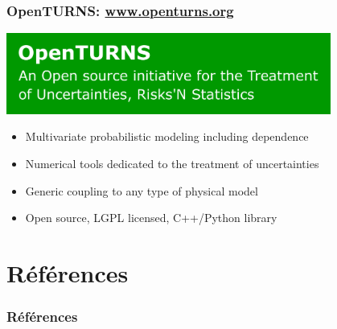 \documentclass[10pt]{beamer}
\begin{document}

\begin{frame}
\frametitle{OpenTURNS: \url{www.openturns.org}}

\begin{center}
\includegraphics[width=0.8\textwidth]{figures/OT.pdf}
\end{center}
	
\begin{itemize}
\item Multivariate probabilistic modeling including dependence
\item Numerical tools dedicated to the treatment of uncertainties
\item Generic coupling to any type of physical model
\item Open source, LGPL licensed, C++/Python library
\end{itemize}


\end{frame}


\section{Références}
\begin{frame}[allowframebreaks]
\frametitle{Références}
\nocite{*}


\end{frame}
\end{document}
